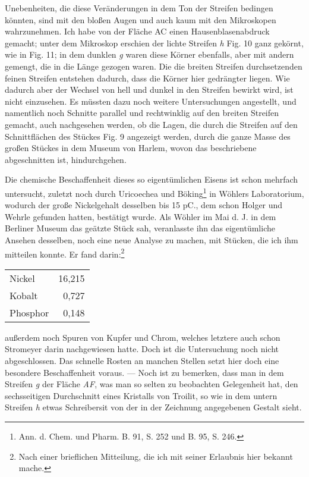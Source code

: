 \documentclass[a4paper, 11pt, oneside]{article}
\begin{document}
Unebenheiten, die diese Veränderungen in dem Ton der Streifen bedingen könnten, sind mit den bloßen Augen und auch kaum mit den Mikroskopen wahrzunehmen. Ich habe von der Fläche AC einen Hausenblasenabdruck gemacht; unter dem Mikroskop erschien der lichte Streifen \emph{h} Fig. 10 ganz gekörnt, wie in Fig. 11; in dem dunklen \emph{g} waren diese Körner ebenfalls, aber mit andern gemengt, die in die Länge gezogen waren. Die die breiten Streifen durchsetzenden feinen Streifen entstehen dadurch, dass die Körner hier gedrängter liegen. Wie dadurch aber der Wechsel von hell und dunkel in den Streifen bewirkt wird, ist nicht einzusehen. Es müssten dazu noch weitere Untersuchungen angestellt, und namentlich noch Schnitte parallel und rechtwinklig auf den breiten Streifen gemacht, auch nachgesehen werden, ob die Lagen, die durch die Streifen auf den Schnittflächen des Stückes Fig. 9 angezeigt werden, durch die ganze Masse des großen Stückes in dem Museum von Harlem, wovon das beschriebene abgeschnitten ist, hindurchgehen.

Die chemische Beschaffenheit dieses so eigentümlichen Eisens ist schon mehrfach untersucht, zuletzt noch durch Uricoechea und Böking\footnote{Ann. d. Chem. und Pharm. B. 91, S. 252 und B. 95, S. 246.} in Wöhlers Laboratorium, wodurch der große Nickelgehalt desselben bis 15 pC., dem schon Holger und Wehrle gefunden hatten, bestätigt wurde. Als Wöhler im Mai d. J. in dem Berliner Museum das geätzte Stück sah, veranlasste ihn das eigentümliche Ansehen desselben, noch eine neue Analyse zu machen, mit Stücken, die ich ihm mitteilen konnte. Er fand darin:\footnote{Nach einer brieflichen Mitteilung, die ich mit seiner Erlaubnis hier bekannt mache.}
\begin{center}
\begin{tabular}{ l r }
    Nickel & 16,215\\
    Kobalt & 0,727\\
    Phosphor & 0,148\\
\end{tabular}
\end{center}
außerdem noch Spuren von Kupfer und Chrom, welches letztere auch schon Stromeyer darin nachgewiesen hatte. Doch ist die Untersuchung noch nicht abgeschlossen. Das schnelle Rosten an manchen Stellen setzt hier doch eine besondere Beschaffenheit voraus. --- Noch ist zu bemerken, dass man in dem Streifen \emph{g} der Fläche \emph{AF}, was man so selten zu beobachten Gelegenheit hat, den sechsseitigen Durchschnitt eines Kristalls von Troilit, so wie in dem untern Streifen \emph{h} etwas Schreibersit von der in der Zeichnung angegebenen Gestalt sieht.
\end{document}
